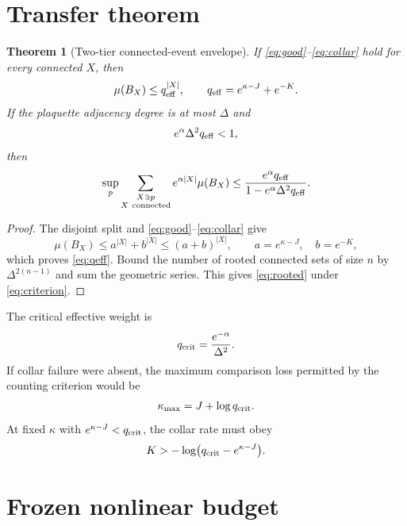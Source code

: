 \documentclass[11pt]{article}
\newtheorem{theorem}{Theorem}[section]
\begin{document}
\section{Transfer theorem}

\begin{theorem}[Two-tier connected-event envelope]
If \eqref{eq:good}--\eqref{eq:collar} hold for every connected $X$, then
\begin{equation}
 \mu(B_X)\leq q_{\rm eff}^{|X|},
 \qquad
 q_{\rm eff}=e^{\kappa-J}+e^{-K}.
 \label{eq:qeff}
\end{equation}
If the plaquette adjacency degree is at most $\Delta$ and
\begin{equation}
 e^\alpha\Delta^2q_{\rm eff}<1,
 \label{eq:criterion}
\end{equation}
then
\begin{equation}
 \sup_p\sum_{\substack{X\ni p\\ X\ \mathrm{connected}}}
 e^{\alpha|X|}\mu(B_X)
 \leq
 \frac{e^\alpha q_{\rm eff}}
 {1-e^\alpha\Delta^2q_{\rm eff}}.
 \label{eq:rooted}
\end{equation}
\end{theorem}
\begin{proof}
The disjoint split and \eqref{eq:good}--\eqref{eq:collar} give
\[
 \mu(B_X)\leq a^{|X|}+b^{|X|}
 \leq(a+b)^{|X|},
 \qquad a=e^{\kappa-J},\quad b=e^{-K},
\]
which proves \eqref{eq:qeff}.  Bound the number of rooted connected sets of
size $n$ by $\Delta^{2(n-1)}$ and sum the geometric series.  This gives
\eqref{eq:rooted} under \eqref{eq:criterion}.
\end{proof}

The critical effective weight is
\begin{equation}
 q_{\rm crit}=\frac{e^{-\alpha}}{\Delta^2}.
 \label{eq:qcrit}
\end{equation}
If collar failure were absent, the maximum comparison loss permitted by the
counting criterion would be
\begin{equation}
 \kappa_{\max}=J+\log q_{\rm crit}.
 \label{eq:kmax}
\end{equation}
At fixed $\kappa$ with $e^{\kappa-J}<q_{\rm crit}$, the collar rate must obey
\begin{equation}
 K> -\log\bigl(q_{\rm crit}-e^{\kappa-J}\bigr).
 \label{eq:kmin}
\end{equation}

\section{Frozen nonlinear budget}
\end{document}
